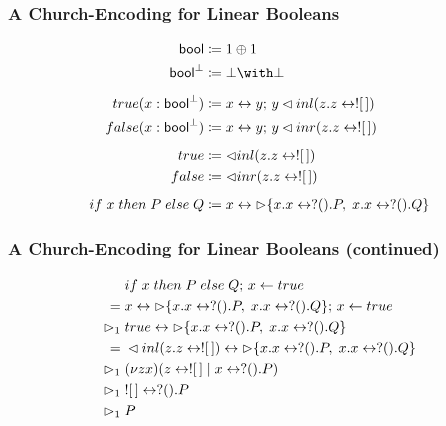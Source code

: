 \documentclass[11pt, aspectratio=169, xcolor={dvipsnames}, usepdftitle=false]{beamer}
\begin{document}
\begin{frame}
  \frametitle{A Church-Encoding for Linear Booleans}
  \vspace{-2em}
  \begin{align*}
    \bool &\coloneq 1 \oplus 1 \\
    \cobool &\coloneq \bot \with \bot \\
    \\[-1em]
    true(x : \cobool) &\coloneq \link{x}{y} \seq y \slselect{z.\link{z}{\sclose}} \\
    false(x : \cobool) &\coloneq \link{x}{y} \seq y \srselect{z.\link{z}{\sclose}} \\
    \\[-1em]
    true &\coloneq \slselect{z.\link{z}{\sclose}} \\
    false &\coloneq \srselect{z.\link{z}{\sclose}} \\
    \\[-1em]
    if \; x \; then \; P \; else \; Q
    &\coloneq \link{x}{\schoice{x.\link{x}{\swait{P}}}{x.\link{x}{\swait{Q}}}}
  \end{align*}
\end{frame}

\begin{frame}
  \frametitle{A Church-Encoding for Linear Booleans (continued)}
  \vspace{-2em}
  \begin{align*}
          &\; if \; x \; then \; P \; else \; Q ;\, x \leftarrow true \\
         =&\; x \leftrightarrow \rhd \{ x.x \leftrightarrow ? ().P,\; x.x \leftrightarrow ? ().Q \} ;\, x \leftarrow true \\
    \rhd_1&\; true \leftrightarrow \rhd \{ x.x \leftrightarrow ? ().P,\; x.x \leftrightarrow ? ().Q \} \\
         =&\; \lhd inl(z.z \leftrightarrow ! [\,]) \leftrightarrow \rhd \{ x.x \leftrightarrow ? ().P,\; x.x \leftrightarrow ? ().Q \} \\
    \rhd_1&\; (\nu z x)(z \leftrightarrow ! [\,] \mid x \leftrightarrow ? ().P) \\
    \rhd_1&\; ! [\,] \leftrightarrow ? ().P \\
    \rhd_1&\; P
  \end{align*}
\end{frame}
\end{document}
